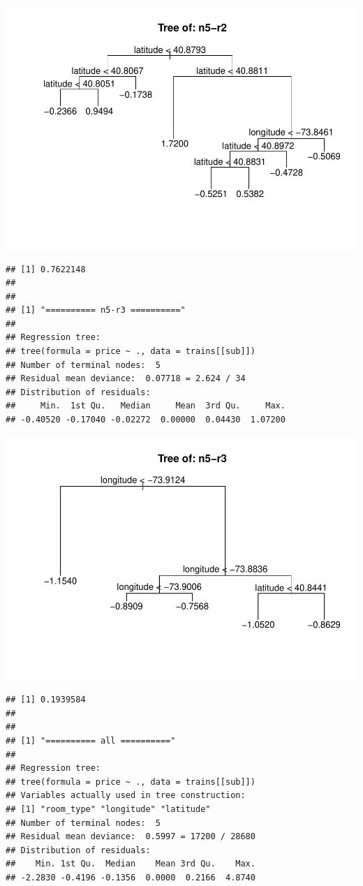 \documentclass[
]{article}
\begin{document}
\includegraphics{project-code_files/figure-latex/unnamed-chunk-14-18.pdf}

\begin{verbatim}
## [1] 0.7622148
## 
## 
## [1] "========== n5-r3 =========="
## 
## Regression tree:
## tree(formula = price ~ ., data = trains[[sub]])
## Number of terminal nodes:  5 
## Residual mean deviance:  0.07718 = 2.624 / 34 
## Distribution of residuals:
##     Min.  1st Qu.   Median     Mean  3rd Qu.     Max. 
## -0.40520 -0.17040 -0.02272  0.00000  0.04430  1.07200
\end{verbatim}

\includegraphics{project-code_files/figure-latex/unnamed-chunk-14-19.pdf}

\begin{verbatim}
## [1] 0.1939584
## 
## 
## [1] "========== all =========="
## 
## Regression tree:
## tree(formula = price ~ ., data = trains[[sub]])
## Variables actually used in tree construction:
## [1] "room_type" "longitude" "latitude" 
## Number of terminal nodes:  5 
## Residual mean deviance:  0.5997 = 17200 / 28680 
## Distribution of residuals:
##    Min. 1st Qu.  Median    Mean 3rd Qu.    Max. 
## -2.2830 -0.4196 -0.1356  0.0000  0.2166  4.8740
\end{verbatim}
\end{document}
